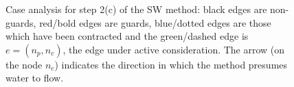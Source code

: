\documentclass[preprint,a4paper]{elsarticle}
\newenvironment{stusubfig}[1]
{
	\begin{figure}[#1]
	\begin{center}
}
{
	\end{center}
	\end{figure}
}
\begin{document}
\begin{stusubfig}{p}
	\hspace{4mm}%
\caption[Case analysis for step 2(c) of the SW method]{Case analysis for step 2(c) of the SW method: black edges are non-guards, red/bold edges are guards, blue/dotted edges are those which have been contracted and the green/dashed edge is $e = (n_p,n_c)$, the edge under active consideration. The arrow (on the node $n_c$) indicates the direction in which the method presumes water to flow.}
\label{fig:segmentation-waterfall-nicholls-cases}
\end{stusubfig}
\end{document}
